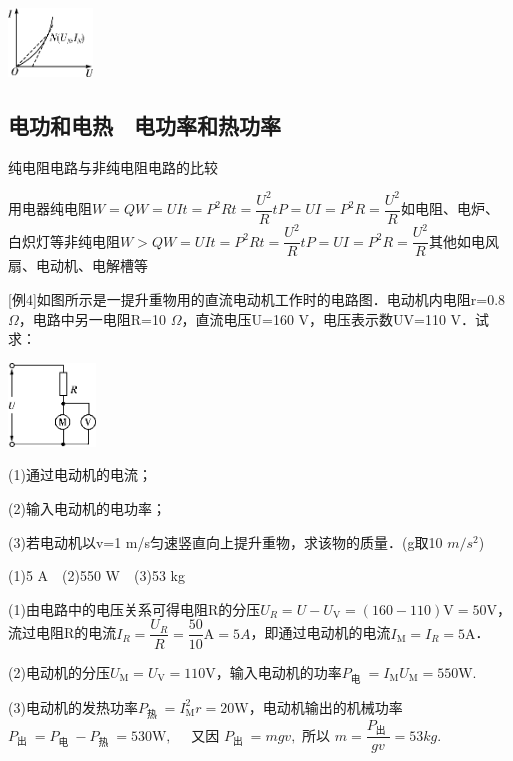 \begin{center}\includegraphics[width=0.88681in,height=0.71667in]{media/image313.png}\end{center}

\subsection{电功和电热　电功率和热功率}
纯电阻电路与非纯电阻电路的比较

用电器纯电阻$W=Q W=U I t=P^{2} R t=\dfrac{U^{2}}{R} t P=U I=P^{2} R=\dfrac{U^{2}}{R}$如电阻、电炉、白炽灯等非纯电阻$W>Q W=U I t=P^{2} R t=\dfrac{U^{2}}{R} t P=U I=P^{2} R=\dfrac{U^{2}}{R}$其他如电风扇、电动机、电解槽等

{[}例4{]}如图所示是一提升重物用的直流电动机工作时的电路图．电动机内电阻r=0.8
$\Omega$，电路中另一电阻R=10 $\Omega$，直流电压U=160 V，电压表示数UV=110 V．试求：

\begin{center}\includegraphics[width=0.91528in,height=0.87708in]{media/image314.png}\end{center}

(1)通过电动机的电流；

(2)输入电动机的电功率；

(3)若电动机以v=1 m/s匀速竖直向上提升重物，求该物的质量．(g取10 $m/s^2$)
\begin{solution}
	(1)5 A　(2)550 W　(3)53 kg
	
	(1)由电路中的电压关系可得电阻R的分压$U_{R}=U-U_{\mathrm{V}}=(160-110) \mathrm{V}=50 \mathrm{V}$，流过电阻R的电流$I_{R}=\dfrac{U_{R}}{R}=\dfrac{50}{10} \mathrm{A}=5A$，即通过电动机的电流$I_{\mathrm{M}}=I_{R}=5 \mathrm{A}$．

(2)电动机的分压$U_{\mathrm{M}}=U_{\mathrm{V}}=110 \mathrm{V}$，输入电动机的功率$P_{\text {电 }}=I_{\mathrm{M}} U_{\mathrm{M}}=550 \mathrm{W}$.

(3)电动机的发热功率$P_{\text {热 }}=I_{\mathrm{M}}^2 r=20 \mathrm{W}$，电动机输出的机械功率$P_{\text {出 }}=P_{\text {电 }}-P_{\text {热 }}=530 \mathrm{W}, \quad$ 又因 $P_{\text {出 }}=m g v,$ 所以 $m=\dfrac{P_{\text {出 }}}{g v}=53 kg$.
\end{solution}


